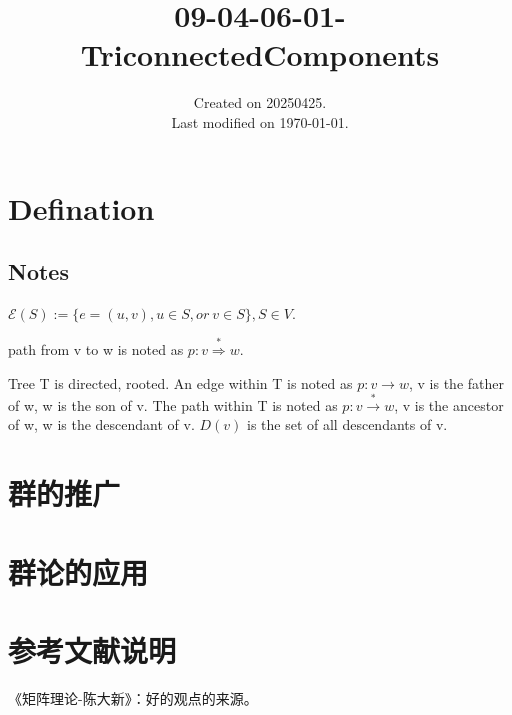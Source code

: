 \documentclass[UTF8]{../../09-Mathematics}
\begin{document}
\title{09-04-06-01-TriconnectedComponents}
\date{Created on 20250425.\\   Last modified on \today.}
\maketitle
\tableofcontents


\chapter{Defination}
 
 

\section{Notes}

$\mathscr{E} (S) := \{ e =(u,v), u\in S, or\ v \in S\}, S \in V$.

path from v to w is noted as $p:v \stackrel{*}{\Rightarrow} w $.
 
Tree T is directed, rooted. 
An edge within T is noted as $p:v \rightarrow w $, v is the father of w, w is the son of v.
The path within T is noted as $p:v \stackrel{*}{\rightarrow} w $, v is the ancestor of w, w is the descendant of v. $D(v)$ is the set of all descendants of v.


\chapter{群的推广}
\chapter{群论的应用}






\chapter{参考文献说明}
《矩阵理论-陈大新》：好的观点的来源。


\end{document}
